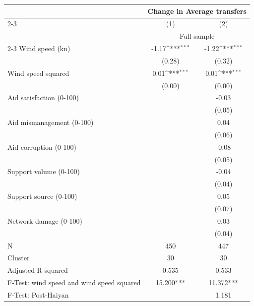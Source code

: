 {
\def\sym#1{\ifmmode^{#1}\else\(^{#1}\)\fi}
\begin{tabular}{l*{2}{c}}
\toprule
                    &\multicolumn{2}{c}{Change in Average transfers}\\\cmidrule(lr){2-3}
                    &\multicolumn{1}{c}{(1)}         &\multicolumn{1}{c}{(2)}         \\
& \multicolumn{2}{c}{Full sample} \\
\cmidrule(lr){2-3}
\midrule
Wind speed (kn)     &       -1.17\sym{***}&       -1.22\sym{***}\\
                    &      (0.28)         &      (0.32)         \\
Wind speed squared  &        0.01\sym{***}&        0.01\sym{***}\\
                    &      (0.00)         &      (0.00)         \\
Aid satisfaction (0-100)&                     &       -0.03         \\
                    &                     &      (0.05)         \\
Aid mismanagement (0-100)&                     &        0.04         \\
                    &                     &      (0.06)         \\
Aid corruption (0-100)&                     &       -0.08         \\
                    &                     &      (0.05)         \\
Support volume (0-100)&                     &       -0.04         \\
                    &                     &      (0.04)         \\
Support source (0-100)&                     &        0.05         \\
                    &                     &      (0.07)         \\
Network damage (0-100)&                     &        0.03         \\
                    &                     &      (0.04)         \\
\midrule
N                   &         450         &         447         \\
Cluster             &          30         &          30         \\
Adjusted R-squared  &       0.535         &       0.533         \\
F-Test: wind speed and wind speed squared&   15.200***         &   11.372***         \\
F-Test: Post-Haiyan &                     &       1.181         \\
\bottomrule
\end{tabular}
}
